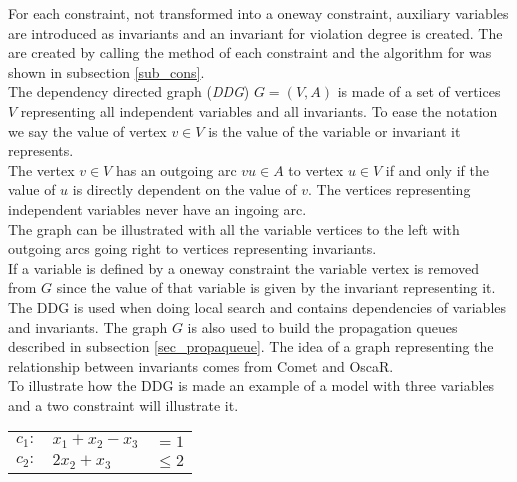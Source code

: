 For each constraint, not transformed into a oneway constraint, auxiliary variables are introduced as invariants and an 
invariant for violation degree is created. The are created by calling the method  of each 
constraint and the algorithm for  was shown in subsection \ref{sub_cons}. \\
The dependency directed graph (\emph{DDG}) $G=(V,A)$ is made of a set of vertices $V$ representing all independent 
variables and all invariants. To ease the notation we say the value of vertex $v \in V$ is the value of the variable or 
invariant it represents. \\
The vertex $v \in V$ has an outgoing arc $vu \in A$ to vertex $u \in V$ if and only if the value of $u$ is directly 
dependent on the value of $v$. The vertices representing independent variables never have an ingoing arc. \\ 
The graph can be illustrated with all the variable vertices to the left with outgoing arcs going right to vertices 
representing invariants. \\  
If a variable is defined by a oneway constraint the variable vertex is removed from $G$ since the value of that 
variable is given by the invariant representing it. \\  
The DDG is used when doing local search and contains dependencies of variables and invariants. The 
graph $G$ is also used to build 
the propagation queues described in subsection \ref{sec_propaqueue}. The idea of a graph representing the relationship 
between invariants comes from Comet \cite[p. 97]{comet} and OscaR\cite[p. 7-9]{oscar}. \\
To illustrate how the DDG is made an example of a model with three variables and a two constraint will 
illustrate it. \\ 
\begin{center}
\begin{tabular}{rlr}
$ c_1: $&$x_1 + x_2 - x_3 $&$= 1$ \\
$ c_2: $&$2x_2 + x_3 $&$\leq 2$ \\
\end{tabular} 
\end{center}
